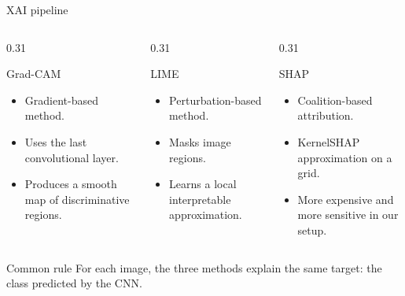 \documentclass[aspectratio=169,10pt]{beamer}
\begin{document}
\begin{frame}{XAI pipeline}
  \begin{columns}[T,totalwidth=\textwidth]
    \begin{column}{0.31\textwidth}
      \begin{block}{Grad-CAM}
        \begin{itemize}
          \item Gradient-based method.
          \item Uses the last convolutional layer.
          \item Produces a smooth map of discriminative regions.
        \end{itemize}
      \end{block}
    \end{column}
    \begin{column}{0.31\textwidth}
      \begin{block}{LIME}
        \begin{itemize}
          \item Perturbation-based method.
          \item Masks image regions.
          \item Learns a local interpretable approximation.
        \end{itemize}
      \end{block}
    \end{column}
    \begin{column}{0.31\textwidth}
      \begin{block}{SHAP}
        \begin{itemize}
          \item Coalition-based attribution.
          \item KernelSHAP approximation on a grid.
          \item More expensive and more sensitive in our setup.
        \end{itemize}
      \end{block}
    \end{column}
  \end{columns}

  \vspace{0.7em}
  \begin{alertblock}{Common rule}
    For each image, the three methods explain the same target: the class predicted by the CNN.
  \end{alertblock}
\end{frame}
\end{document}

